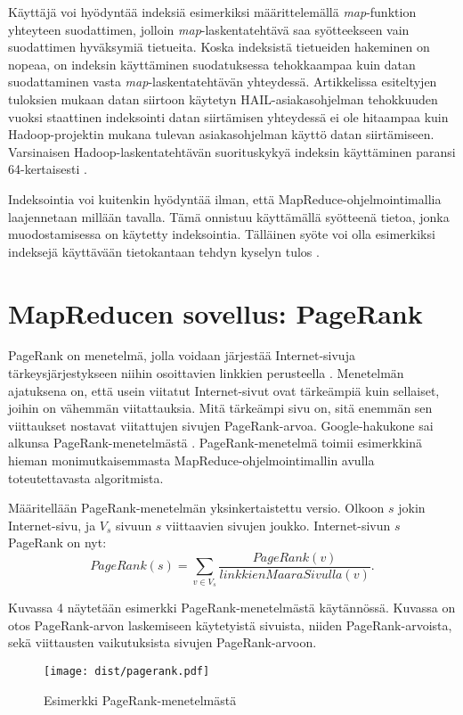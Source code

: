 \documentclass[finnish]{templates/tktltiki2}
\theoremstyle{definition}
\theoremstyle{remark}
\begin{document}
Käyttäjä voi hyödyntää indeksiä esimerkiksi määrittelemällä
\emph{map}-funktion yhteyteen suodattimen, jolloin
\emph{map}-laskentatehtävä saa syötteekseen vain suodattimen hyväksymiä
tietueita. Koska indeksistä tietueiden hakeminen on nopeaa, on indeksin
käyttäminen suodatuksessa tehokkaampaa kuin datan suodattaminen vasta
\emph{map}-laskentatehtävän yhteydessä. Artikkelissa esiteltyjen
tuloksien mukaan datan siirtoon käytetyn HAIL-asiakasohjelman
tehokkuuden vuoksi staattinen indeksointi datan siirtämisen yhteydessä
ei ole hitaampaa kuin Hadoop-projektin mukana tulevan asiakasohjelman
käyttö datan siirtämiseen. Varsinaisen Hadoop-laskentatehtävän
suorituskykyä indeksin käyttäminen paransi 64-kertaisesti
\cite{hail}.

Indeksointia voi kuitenkin hyödyntää ilman, että
MapReduce-ohjelmointimallia laajennetaan millään tavalla. Tämä onnistuu
käyttämällä syötteenä tietoa, jonka muodostamisessa on käytetty
indeksointia. Tälläinen syöte voi olla esimerkiksi indeksejä käyttävään tietokantaan tehdyn kyselyn tulos \cite{mapreduce2}.

\section{MapReducen sovellus:
PageRank}\label{mapreducen-sovellus-pagerank}

PageRank on menetelmä, jolla voidaan järjestää Internet-sivuja
tärkeysjärjestykseen niihin osoittavien linkkien perusteella
\cite{pagerank}. Menetelmän ajatuksena on, että usein viitatut
Internet-sivut ovat tärkeämpiä kuin sellaiset, joihin on vähemmän
viitattauksia. Mitä tärkeämpi sivu on, sitä enemmän sen viittaukset
nostavat viitattujen sivujen PageRank-arvoa. Google-hakukone sai alkunsa
PageRank-menetelmästä \cite{pagerank}. PageRank-menetelmä toimii
esimerkkinä hieman monimutkaisemmasta MapReduce-ohjelmointimallin avulla
toteutettavasta algoritmista.

Määritellään PageRank-menetelmän yksinkertaistettu versio. Olkoon \(s\)
jokin Internet-sivu, ja \(V_s\) sivuun \(s\) viittaavien sivujen joukko.
Internet-sivun \(s\) PageRank on nyt: \[
PageRank(s) = \sum_{v \in V_s} \frac {PageRank(v)} {linkkienMaaraSivulla(v)}.
\]

Kuvassa 4 näytetään esimerkki PageRank-menetelmästä käytännössä. Kuvassa
on otos PageRank-arvon laskemiseen käytetyistä sivuista, niiden
PageRank-arvoista, sekä viittausten vaikutuksista sivujen
PageRank-arvoon.

\begin{figure}[!b]
\centering
\texttt{[image: dist/pagerank.pdf]}
\caption{Esimerkki PageRank-menetelmästä}
\end{figure}
\end{document}
